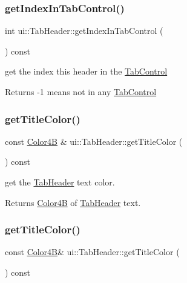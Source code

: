 \subsubsection{\texorpdfstring{get\+Index\+In\+Tab\+Control()}{getIndexInTabControl()}\hspace{0.1cm}{\footnotesize\ttfamily [2/2]}}
{\footnotesize\ttfamily int ui\+::\+Tab\+Header\+::get\+Index\+In\+Tab\+Control (\begin{DoxyParamCaption}{ }\end{DoxyParamCaption}) const}

get the index this header in the \hyperlink{classui_1_1TabControl}{Tab\+Control} \begin{DoxyReturn}{Returns}
-\/1 means not in any \hyperlink{classui_1_1TabControl}{Tab\+Control} 
\end{DoxyReturn}
\mbox{\label{classui_1_1TabHeader_afc4c6d5f3376c342b3e5d490f2b6dffd}} 
\subsubsection{\texorpdfstring{get\+Title\+Color()}{getTitleColor()}\hspace{0.1cm}{\footnotesize\ttfamily [1/2]}}
{\footnotesize\ttfamily const \hyperlink{structColor4B}{Color4B} \& ui\+::\+Tab\+Header\+::get\+Title\+Color (\begin{DoxyParamCaption}{ }\end{DoxyParamCaption}) const}

get the \hyperlink{classui_1_1TabHeader}{Tab\+Header} text color. \begin{DoxyReturn}{Returns}
\hyperlink{structColor4B}{Color4B} of \hyperlink{classui_1_1TabHeader}{Tab\+Header} text. 
\end{DoxyReturn}
\mbox{\label{classui_1_1TabHeader_a7430d71c2580112511e7cc87d360b7db}} 
\subsubsection{\texorpdfstring{get\+Title\+Color()}{getTitleColor()}\hspace{0.1cm}{\footnotesize\ttfamily [2/2]}}
{\footnotesize\ttfamily const \hyperlink{structColor4B}{Color4B}\& ui\+::\+Tab\+Header\+::get\+Title\+Color (\begin{DoxyParamCaption}{ }\end{DoxyParamCaption}) const}

